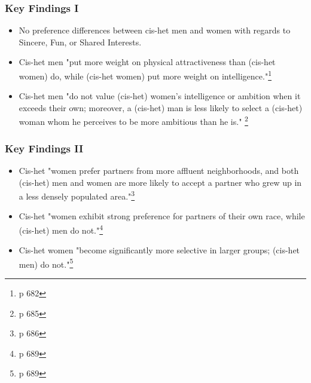 \documentclass[handout,xcolor=pdftex,dvipsnames,table]{beamer}
\begin{document}
\begin{frame} \frametitle{Key Findings I}
     \begin{itemize}
        \item No preference differences between cis-het men and women with regards to Sincere, Fun, or Shared Interests. \pause
        \item Cis-het men "put more weight on physical attractiveness than (cis-het women) do, while (cis-het women) put more weight on intelligence."\footnote{p 682}  \pause
        \item Cis-het men "do not value (cis-het) women's intelligence or ambition when it exceeds their own; moreover, a (cis-het) man is less likely to select a (cis-het) woman whom he perceives to be more ambitious than he is." \footnote{p 685}
    \end{itemize}
\end{frame}

\begin{frame} \frametitle{Key Findings II}
     \begin{itemize}
        \item Cis-het "women prefer partners from more affluent neighborhoods, and both (cis-het) men and women are more likely to accept a partner who grew up in a less densely populated area."\footnote{p 686} \pause
        \item Cis-het "women exhibit strong preference for partners of their own race, while (cis-het) men do not."\footnote{p 689}
        \item Cis-het women "become significantly more selective in larger groups; (cis-het men) do not."\footnote{p 689}
    \end{itemize}
\end{frame}
\end{document}
